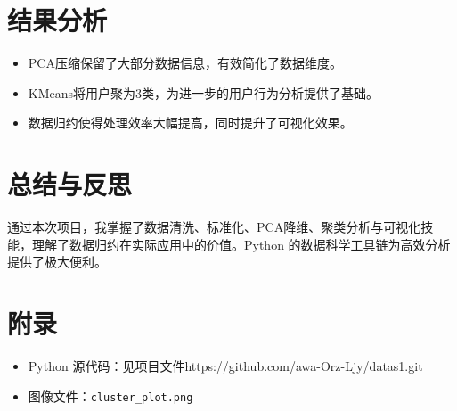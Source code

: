 \documentclass[10pt]{ctexart}
\begin{document}
\section{结果分析}
\begin{itemize}
    \item PCA压缩保留了大部分数据信息，有效简化了数据维度。
    \item KMeans将用户聚为3类，为进一步的用户行为分析提供了基础。
    \item 数据归约使得处理效率大幅提高，同时提升了可视化效果。
\end{itemize}

\section{总结与反思}
通过本次项目，我掌握了数据清洗、标准化、PCA降维、聚类分析与可视化技能，理解了数据归约在实际应用中的价值。Python 的数据科学工具链为高效分析提供了极大便利。

\section*{附录}
\begin{itemize}
    \item Python 源代码：见项目文件https://github.com/awa-Orz-Ljy/datas1.git
    \item 图像文件：\texttt{cluster\_plot.png}
\end{itemize}
\end{document}
